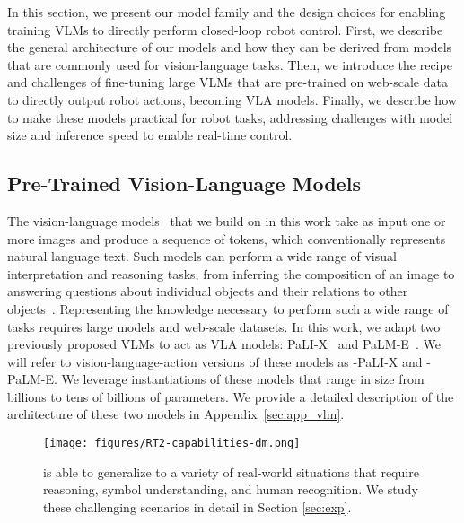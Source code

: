 In this section, we present our model family and the design choices for enabling training VLMs to directly perform closed-loop robot control.
First, we describe the general architecture of our models and how they can be
derived from models that are commonly used for vision-language tasks. Then, we introduce the recipe and challenges of fine-tuning large VLMs that are pre-trained on web-scale data to directly output robot actions, becoming VLA models. Finally, we describe how to make these models practical for robot tasks, addressing challenges with model size and inference speed to enable real-time control.

\subsection{Pre-Trained Vision-Language Models}

The vision-language models~\citep{chen2023palix,driess2023palm} that we build on in this work take as input one or more images and produce a sequence of tokens, which conventionally represents natural language text. Such models can perform a wide range of visual interpretation and reasoning tasks, from inferring the composition of an image to answering questions about individual objects and their relations to other objects~\citep{alayrac2022flamingo,chen2023palix,driess2023palm,huang2023language}. Representing the knowledge necessary to perform such a wide range of tasks requires large models and web-scale datasets. In this work, we adapt two previously proposed VLMs to act as VLA models: PaLI-X~\citep{chen2023palix} and PaLM-E~\citep{driess2023palm}. We will refer to vision-language-action versions of these models as \methodname-PaLI-X and \methodname-PaLM-E. 
We leverage instantiations of these models that range in size from billions to tens of billions of parameters. We provide a detailed description of the architecture of these two models in Appendix~\ref{sec:app_vlm}.

\begin{figure}[h]
    \centering
    \texttt{[image: figures/RT2-capabilities-dm.png]}
    \caption{\methodname is able to generalize to a variety of real-world situations that require reasoning, symbol understanding, and human recognition. We study these challenging scenarios in detail in Section \ref{sec:exp}.
    }
    \label{fig:qualitative_emergent}
    \vspace{-0.2cm}
\end{figure}

